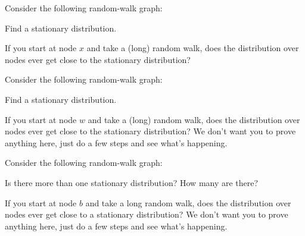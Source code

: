 \documentclass[11pt,twoside]{article}
\begin{document}
 

\newcommand{\vout}[1]{\text{out}(#1)}
\newcommand{\vin}[1]{\text{in}(#1)}
\newcommand{\odeg}[1]{\text{out-degree}(#1)}
\newcommand{\ideg}[1]{\text{in-degree}(#1)}

\begin{problem}

Consider the following random-walk graph:


\bparts
\ppart Find a stationary distribution.

\ppart If you start at node $x$ and take a (long) random walk, does the
distribution over nodes ever get close to the stationary distribution?

\eparts

Consider the following random-walk graph:


\bparts
\ppart Find a stationary distribution.

\ppart If you start at node $w$ and take a (long) random walk, does
the distribution over nodes ever get close to the stationary
distribution?  We don't want you to prove anything here, just do a few
steps and see what's happening.

\eparts


Consider the following random-walk graph:


\bparts
\ppart Is there more than one stationary distribution? How many are
there?


\ppart If you start at node $b$ and take a long random walk, does the
distribution over nodes ever get close to a stationary distribution?  We
don't want you to prove anything here, just do a few steps and see what's happening.

\eparts
\end{problem}
\end{document}
